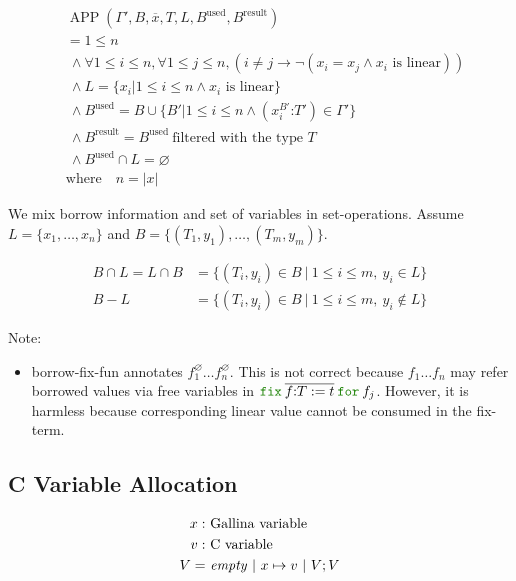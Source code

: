 \documentclass[a4paper,fleqn]{article}
\def\gallina{\textrm{Gallina}}
\newcommand{\kwfix}{\mbox{\color{mygreen}\ttfamily fix}}
\newcommand{\kwfor}{\mbox{\color{mygreen}\ttfamily for}}
\newcommand{\lassum}[2]{(#1\mathord{:}#2)}
\newcommand{\ofix}[2]{\kwfix\:{#1}\:\kwfor\:{#2}}
\DeclareMathOperator{\APP}{APP}
\begin{document}
\begin{align*}
  &\APP(\Gamma', B, \overline{x}, T, L, B^\text{used}, B^\text{result}) \\
  &= 1 \leq n \\
  &~\wedge \forall 1 \leq i \leq n, \forall 1 \leq j \leq n, (i \neq j \rightarrow \neg (x_i = x_j \wedge \text{$x_i$ is linear})) \\
  &~\wedge L = \{ x_i | 1 \leq i \leq n \wedge \text{$x_i$ is linear} \} \\
  &~\wedge B^\text{used} = B \cup \{ B' | 1 \leq i \leq n \wedge \lassum{x_i^{B'}}{T'} \in \Gamma' \} \\
  &~\wedge B^\text{result} = B^\text{used} ~\text{filtered with the type $T$} \\
  &~\wedge B^\text{used} \cap L = \varnothing \\
  &\text{where} \quad n = |x|
\end{align*}

We mix borrow information and set of variables in set-operations.
Assume $L=\{x_1,\ldots,x_n\}$ and $B=\{(T_1,y_1),\ldots,(T_m,y_m)\}$.

\begin{align*}
  B \cap L = L \cap B &= \{(T_i,y_i) \in B ~|~ 1\leq i\leq m,~ y_i \in L \} \\
  B - L &= \{(T_i,y_i) \in B ~|~ 1\leq i\leq m,~ y_i \not\in L \}
\end{align*}

{\small Note:
\begin{itemize}
  \item borrow-fix-fun annotates $f_1^\varnothing \ldots f_n^\varnothing$.
    This is not correct because $f_1\ldots f_n$ may refer borrowed values via free variables in
    $\ofix{\overline{f{:}T:=t}}{f_j}$.
    However, it is harmless because corresponding linear value cannot be consumed in the fix-term.
\end{itemize}}

\subsection{C Variable Allocation}\label{sec:cvaralloc}

\begin{align*}
  x :&\ \mbox{\gallina{} variable} \\
  v :&\ \mbox{C variable} \\
  V =&\ \mathit{empty} ~|~ x \mapsto v ~|~ V;V
\end{align*}
\end{document}
